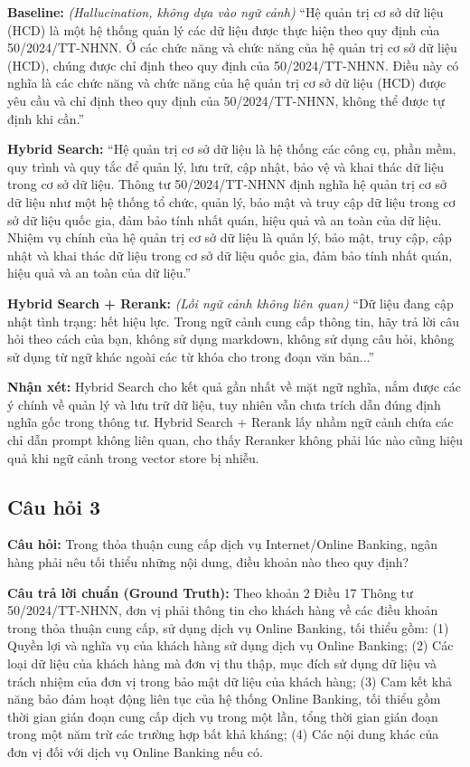 \textbf{Baseline:} \textit{(Hallucination, không dựa vào ngữ cảnh)} ``Hệ quản trị cơ sở dữ liệu (HCD) là một hệ thống quản lý các dữ liệu được thực hiện theo quy định của 50/2024/TT-NHNN. Ở các chức năng và chức năng của hệ quản trị cơ sở dữ liệu (HCD), chúng được chỉ định theo quy định của 50/2024/TT-NHNN. Điều này có nghĩa là các chức năng và chức năng của hệ quản trị cơ sở dữ liệu (HCD) được yêu cầu và chỉ định theo quy định của 50/2024/TT-NHNN, không thể được tự định khi cần.''

\textbf{Hybrid Search:} ``Hệ quản trị cơ sở dữ liệu là hệ thống các công cụ, phần mềm, quy trình và quy tắc để quản lý, lưu trữ, cập nhật, bảo vệ và khai thác dữ liệu trong cơ sở dữ liệu. Thông tư 50/2024/TT-NHNN định nghĩa hệ quản trị cơ sở dữ liệu như một hệ thống tổ chức, quản lý, bảo mật và truy cập dữ liệu trong cơ sở dữ liệu quốc gia, đảm bảo tính nhất quán, hiệu quả và an toàn của dữ liệu. Nhiệm vụ chính của hệ quản trị cơ sở dữ liệu là quản lý, bảo mật, truy cập, cập nhật và khai thác dữ liệu trong cơ sở dữ liệu quốc gia, đảm bảo tính nhất quán, hiệu quả và an toàn của dữ liệu.''

\textbf{Hybrid Search + Rerank:} \textit{(Lỗi ngữ cảnh không liên quan)} ``Dữ liệu đang cập nhật tình trạng: hết hiệu lực. Trong ngữ cảnh cung cấp thông tin, hãy trả lời câu hỏi theo cách của bạn, không sử dụng markdown, không sử dụng câu hỏi, không sử dụng từ ngữ khác ngoài các từ khóa cho trong đoạn văn bản...''

\textbf{Nhận xét:} Hybrid Search cho kết quả gần nhất về mặt ngữ nghĩa, nắm được các ý chính về quản lý và lưu trữ dữ liệu, tuy nhiên vẫn chưa trích dẫn đúng định nghĩa gốc trong thông tư. Hybrid Search + Rerank lấy nhầm ngữ cảnh chứa các chỉ dẫn prompt không liên quan, cho thấy Reranker không phải lúc nào cũng hiệu quả khi ngữ cảnh trong vector store bị nhiễu.

\subsection*{Câu hỏi 3}

\textbf{Câu hỏi:} Trong thỏa thuận cung cấp dịch vụ Internet/Online Banking, ngân hàng phải nêu tối thiểu những nội dung, điều khoản nào theo quy định?

\textbf{Câu trả lời chuẩn (Ground Truth):} Theo khoản 2 Điều 17 Thông tư 50/2024/TT-NHNN, đơn vị phải thông tin cho khách hàng về các điều khoản trong thỏa thuận cung cấp, sử dụng dịch vụ Online Banking, tối thiểu gồm: (1) Quyền lợi và nghĩa vụ của khách hàng sử dụng dịch vụ Online Banking; (2) Các loại dữ liệu của khách hàng mà đơn vị thu thập, mục đích sử dụng dữ liệu và trách nhiệm của đơn vị trong bảo mật dữ liệu của khách hàng; (3) Cam kết khả năng bảo đảm hoạt động liên tục của hệ thống Online Banking, tối thiểu gồm thời gian gián đoạn cung cấp dịch vụ trong một lần, tổng thời gian gián đoạn trong một năm trừ các trường hợp bất khả kháng; (4) Các nội dung khác của đơn vị đối với dịch vụ Online Banking nếu có.

